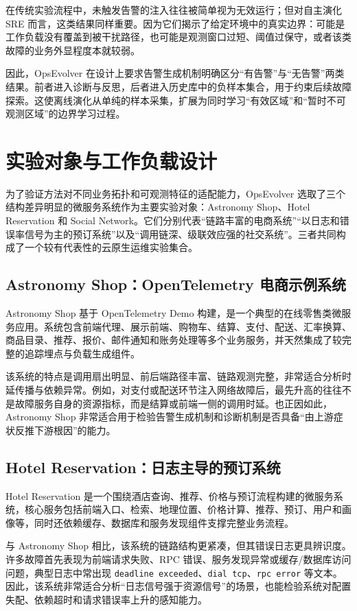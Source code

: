在传统实验流程中，未触发告警的注入往往被简单视为无效运行；但对自主演化 SRE 而言，这类结果同样重要。因为它们揭示了给定环境中的真实边界：可能是工作负载没有覆盖到被干扰路径，也可能是观测窗口过短、阈值过保守，或者该类故障的业务外显程度本就较弱。

因此，OpsEvolver 在设计上要求告警生成机制明确区分“有告警”与“无告警”两类结果。前者进入诊断与反思，后者进入历史库中的负样本集合，用于约束后续故障探索。这使离线演化从单纯的样本采集，扩展为同时学习“有效区域”和“暂时不可观测区域”的边界学习过程。

\section{实验对象与工作负载设计}
\label{sec:benchmark_and_workload_design}

为了验证方法对不同业务拓扑和可观测特征的适配能力，OpsEvolver 选取了三个结构差异明显的微服务系统作为主要实验对象：Astronomy Shop、Hotel Reservation 和 Social Network。它们分别代表“链路丰富的电商系统”“以日志和错误率信号为主的预订系统”以及“调用链深、级联效应强的社交系统”。三者共同构成了一个较有代表性的云原生运维实验集合。

\subsection{Astronomy Shop：OpenTelemetry 电商示例系统}

Astronomy Shop 基于 OpenTelemetry Demo 构建，是一个典型的在线零售类微服务应用。系统包含前端代理、展示前端、购物车、结算、支付、配送、汇率换算、商品目录、推荐、报价、邮件通知和账务处理等多个业务服务，并天然集成了较完整的追踪埋点与负载生成组件。

该系统的特点是调用扇出明显、前后端路径丰富、链路观测完整，非常适合分析时延传播与依赖异常。例如，对支付或配送环节注入网络故障后，最先升高的往往不是故障服务自身的资源指标，而是结算或前端一侧的调用时延。也正因如此，Astronomy Shop 非常适合用于检验告警生成机制和诊断机制是否具备“由上游症状反推下游根因”的能力。

\subsection{Hotel Reservation：日志主导的预订系统}

Hotel Reservation 是一个围绕酒店查询、推荐、价格与预订流程构建的微服务系统，核心服务包括前端入口、检索、地理位置、价格计算、推荐、预订、用户和画像等，同时还依赖缓存、数据库和服务发现组件支撑完整业务流程。

与 Astronomy Shop 相比，该系统的链路结构更紧凑，但其错误日志更具辨识度。许多故障首先表现为前端请求失败、RPC 错误、服务发现异常或缓存/数据库访问问题，典型日志中常出现 \texttt{deadline exceeded}、\texttt{dial tcp}、\texttt{rpc error} 等文本。因此，该系统非常适合分析“日志信号强于资源信号”的场景，也能检验系统对配置失配、依赖超时和请求错误率上升的感知能力。

